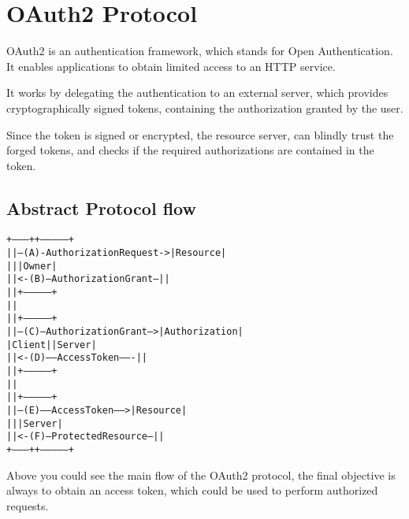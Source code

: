 
\section{OAuth2 Protocol}
OAuth2 is an authentication framework, which stands for Open Authentication.
It enables applications to obtain limited access to an HTTP service.

It works by delegating the authentication to an external server, which provides
cryptographically signed tokens, containing the authorization granted by the
user.

Since the token is signed or encrypted, the resource server, can blindly trust
the forged tokens, and checks if the required authorizations are contained in
the token.


\subsection{Abstract Protocol flow}
\begin{alltt}
     +--------+                               +---------------+
     |        |--(A)- Authorization Request ->|   Resource    |
     |        |                               |     Owner     |
     |        |<-(B)-- Authorization Grant ---|               |
     |        |                               +---------------+
     |        |
     |        |                               +---------------+
     |        |--(C)-- Authorization Grant -->| Authorization |
     | Client |                               |     Server    |
     |        |<-(D)----- Access Token -------|               |
     |        |                               +---------------+
     |        |
     |        |                               +---------------+
     |        |--(E)----- Access Token ------>|    Resource   |
     |        |                               |     Server    |
     |        |<-(F)--- Protected Resource ---|               |
     +--------+                               +---------------+
 \end{alltt}
Above you could see the main flow of the OAuth2 protocol, the final objective is
always to obtain an access token, which could be used to perform authorized
requests.


